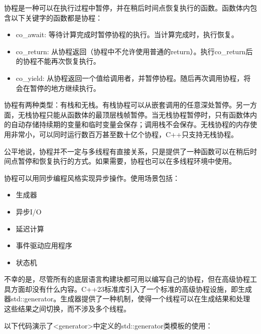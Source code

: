 协程是一种可以在执行过程中暂停，并在稍后时间点恢复执行的函数。函数体内包含以下关键字的函数都是协程：

\begin{itemize}
\item
co\_await: 等待计算完成时暂停协程的执行。当计算完成时，执行恢复。

\item
co\_return: 从协程返回（协程中不允许使用普通的return）。执行co\_return后的协程不能再次恢复执行。

\item
co\_yield: 从协程返回一个值给调用者，并暂停协程。随后再次调用协程，将会在暂停的地方继续执行。
\end{itemize}

协程有两种类型：有栈和无栈。有栈协程可以从嵌套调用的任意深处暂停。另一方面，无栈协程只能从函数体的最顶层栈帧暂停。当无栈协程暂停时，只有函数体内的自动存储持续期的变量和临时变量会保存；调用栈不会保存。无栈协程的内存使用非常小，可以同时运行数百万甚至数十亿个协程，C++只支持无栈协程。

公平地说，协程并不一定与多线程有直接关系，只是提供了一种函数可以在稍后时间点暂停和恢复执行的方式。如果需要，协程也可以在多线程环境中使用。

协程可以用同步编程风格实现异步操作。使用场景包括：

\begin{itemize}
\item
生成器

\item
异步I/O

\item
延迟计算

\item
事件驱动应用程序

\item
状态机
\end{itemize}


不幸的是，尽管所有的底层语言构建块都可用以编写自己的协程，但在高级协程工具方面却没有什么内容。C++23标准库引入了一个标准的高级协程设施，即生成器std::generator。生成器提供了一种机制，使得一个线程可以在生成结果和处理这些结果之间切换，而不涉及多个线程。

以下代码演示了<generator>中定义的std::generator类模板的使用：


